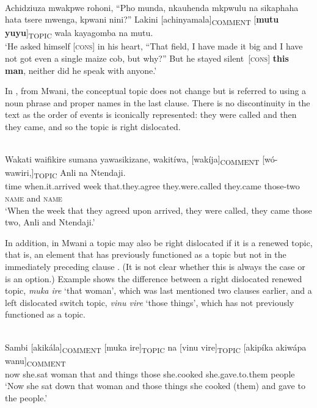 \documentclass[output=paper]{langsci/langscibook}
\begin{document}
\ea\label{ex:11.nicolle}
\\
  Achidziuza mwakpwe rohoni, “Pho munda, nkauhenda mkpwulu na sikaphaha hata tsere mwenga, kpwani nini?” Lakini [achinyamala]\textsubscript{COMMENT} [\textbf{mutu yuyu}]\textsubscript{TOPIC} wala kayagomba na mutu.\\ 
\glt ‘He asked himself [\textsc{cons}] in his heart, “That field, I have made it big and I have not got even a single maize cob, but why?” But he stayed silent~[\textsc{cons}] \textbf{this man}, neither did he speak with anyone.’
\z

In , from Mwani, the conceptual topic does not change but is referred to using a noun phrase and proper names in the last clause. There is no discontinuity in the text as the order of events is iconically represented: they were called and then they came, and so the topic is right dislocated.

\ea\label{ex:12.nicolle}
\\
\gll Wakati waifikire sumana yawasikizane, wakitíwa, [wakíja]\textsubscript{COMMENT} [wó-wawiri,]\textsubscript{TOPIC} Anli na Ntendaji.\\
time when.it.arrived week that.they.agree they.were.called {\db}they.came {\db}those-two \textsc{name} and \textsc{name}\\
\glt ‘When the week that they agreed upon arrived, they were called, they came those two, Anli and Ntendaji.’
\z

In addition, in Mwani a topic may also be right dislocated if it is a renewed topic, that is, an element that has previously functioned as a topic but not in the immediately preceding clause \citep[10-11]{floor2005}. (It is not clear whether this is always the case or is an option.) Example  shows the difference between a right dislocated renewed topic, \textit{muk}\textit{a ire} ‘that woman’, which was last mentioned two clauses earlier, and a left dislocated switch topic, \textit{vinu vire} ‘those things’, which has not previously functioned as a topic.

\ea\label{ex:13.nicolle}
\\
\gll Sambi [akikála]\textsubscript{COMMENT} [muka ire]\textsubscript{TOPIC} na [vinu vire]\textsubscript{TOPIC} [akipíka akiwápa wanu]\textsubscript{COMMENT}\\
now {\db}she.sat {\db}woman that and {\db}things those {\db}she.cooked she.gave.to.them people\\
\glt ‘Now she sat down that woman and those things she cooked (them) and gave to the people.’
\z
\end{document}
